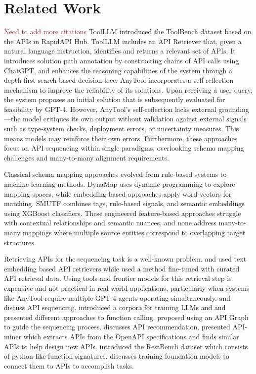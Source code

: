 \documentclass[sigconf, nonacm]{acmart}
\newcommand{\bg}[1]{\textcolor{brown}{#1}}
\begin{document}
\section{Related Work}

\bg{Need to add more citations}
ToolLLM \cite{toolllm} introduced the ToolBench dataset based on the APIs in RapidAPI Hub. ToolLLM includes an API Retriever that, given a natural language instruction, identifies and returns a relevant set of APIs. It introduces solution path annotation by constructing chains of API calls using ChatGPT, and enhances the reasoning capabilities of the system through a depth-first search based decision tree. AnyTool \cite{anytool} incorporates a self-reflection mechanism to improve the reliability of its solutions. Upon receiving a user query, the system proposes an initial solution that is subsequently evaluated for feasibility by GPT-4. However, AnyTool's self-reflection lacks external grounding—the model critiques its own output without validation against external signals such as type-system checks, deployment errors, or uncertainty measures. This means models may reinforce their own errors. Furthermore, these approaches focus on API sequencing within single paradigms, overlooking schema mapping challenges and many-to-many alignment requirements.

Classical schema mapping approaches evolved from rule-based systems to machine learning methods. DynaMap \cite{mazilu2022schema} uses dynamic programming to explore mapping spaces, while embedding-based approaches \cite{hättasch2022its} apply word vectors for matching. SMUTF \cite{zhang2025smutf} combines tags, rule-based signals, and semantic embeddings using XGBoost classifiers. These engineered feature-based approaches struggle with contextual relationships and semantic nuances, and none address many-to-many mappings where multiple source entities correspond to overlapping target structures.

Retrieving APIs for the sequencing task is a well-known problem. \cite{li2023api} and \cite{patil2023gorilla} used text embedding based API retrievers while \cite{toolllm} used a method fine-tuned with curated API retrieval data. Using tools and frontier models for this retrieval step is expensive and not practical in real world applications, particularly when systems like AnyTool require multiple GPT-4 agents operating simultaneously. \cite{saha2024sequential} and \cite{mandal2024graph} discuss API sequencing. \cite{basu-etal-2024-api} introduced a corpora for training LLMs and \cite{patil2023gorilla} and \cite{abdelaziz2024granitefunctioncallingmodelintroducing} presented different approaches to function calling. \cite{mandal2024graph} proposed using an API Graph to guide the sequencing process. \cite{chen2024apigen} discusses API recommendation. \cite{moon2024api} presented API-miner which extracts APIs from the OpenAPI specifications and finds similar APIs to help design new APIs. \cite{song2023restgpt} introduced the RestBench dataset which consists of python-like function signatures. \cite{liang2024taskmatrix} discusses training foundation models to connect them to APIs to accomplish tasks.
\end{document}
